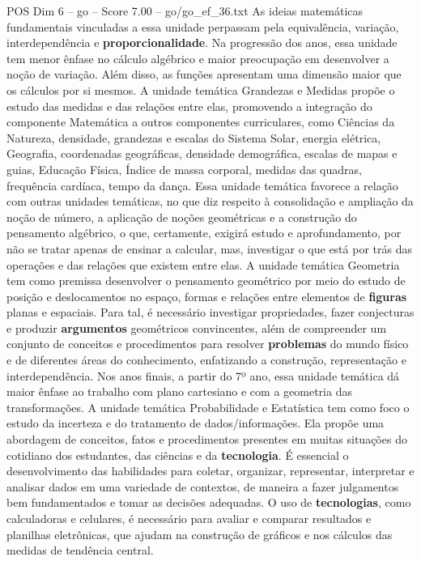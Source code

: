 \begin{textsample}{POS Dim 6 – go – Score 7.00 – go/go\_ef\_36.txt}
As ideias matemáticas fundamentais vinculadas a essa unidade perpassam pela equivalência, variação, interdependência e \textbf{proporcionalidade}.
Na progressão dos anos, essa unidade tem menor ênfase no cálculo algébrico e maior preocupação em desenvolver a noção de variação.
Além disso, as funções apresentam uma dimensão maior que os cálculos por si mesmos.
A unidade temática Grandezas e Medidas propõe o estudo das medidas e das relações entre elas, promovendo a integração do componente Matemática a outros componentes curriculares, como Ciências da Natureza, densidade, grandezas e escalas do Sistema Solar, energia elétrica, Geografia, coordenadas geográficas, densidade demográfica, escalas de mapas e guias, Educação Física, Índice de massa corporal, medidas das quadras, frequência cardíaca, tempo da dança.
Essa unidade temática favorece a relação com outras unidades temáticas, no que diz respeito à consolidação e ampliação da noção de número, a aplicação de noções geométricas e a construção do pensamento algébrico, o que, certamente, exigirá estudo e aprofundamento, por não se tratar apenas de ensinar a calcular, mas, investigar o que está por trás das operações e das relações que existem entre elas.
A unidade temática Geometria tem como premissa desenvolver o pensamento geométrico por meio do estudo de posição e deslocamentos no espaço, formas e relações entre elementos de \textbf{figuras} planas e espaciais.
Para tal, é necessário investigar propriedades, fazer conjecturas e produzir \textbf{argumentos} geométricos convincentes, além de compreender um conjunto de conceitos e procedimentos para resolver \textbf{problemas} do mundo físico e de diferentes áreas do conhecimento, enfatizando a construção, representação e interdependência.
Nos anos finais, a partir do 7º ano, essa unidade temática dá maior ênfase ao trabalho com plano cartesiano e com a geometria das transformações.
A unidade temática Probabilidade e Estatística tem como foco o estudo da incerteza e do tratamento de dados/informações.
Ela propõe uma abordagem de conceitos, fatos e procedimentos presentes em muitas situações do cotidiano dos estudantes, das ciências e da \textbf{tecnologia}.
É essencial o desenvolvimento das habilidades para coletar, organizar, representar, interpretar e analisar dados em uma variedade de contextos, de maneira a fazer julgamentos bem fundamentados e tomar as decisões adequadas.
O uso de \textbf{tecnologias}, como calculadoras e celulares, é necessário para avaliar e comparar resultados e planilhas eletrônicas, que ajudam na construção de gráficos e nos cálculos das medidas de tendência central.

\end{textsample}
